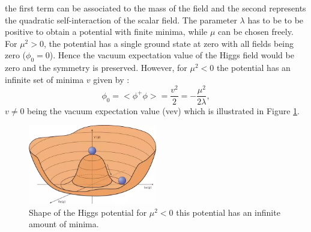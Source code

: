the first term can be associated to the mass of the field and the second represents the quadratic self-interaction of the scalar field. The parameter $\lambda$ has to be to be positive to obtain a potential with finite minima, while $\mu$ can be chosen freely. For $\mu^{2} > 0$, the potential has a single ground state at zero with all fields being zero ($\phi_0 = 0$). Hence the vacuum expectation value of the Higgs field would be zero and the symmetry is preserved. However, for $\mu^{2} < 0$ the potential has an infinite set of minima $v$ given by :
\begin{equation}
    \phi_{0}=<\phi^{+} \phi>=\frac{v^{2}}{2}=-\frac{\mu^{2}}{2 \lambda},
\end{equation}
$v\neq0$ being the vacuum expectation value (vev) which is illustrated in Figure \ref{fig:chap1:Higggs_potential}.
\begin{figure}[htbp]
    \centering
    \includegraphics[width=0.5\textwidth]{Ch1/Img/Higgs_potential.png}
    \caption{Shape of the Higgs potential for $\mu^{2} < 0$ this potential has an infinite amount of minima. \cite{HiggsPotential}}
    \label{fig:chap1:Higggs_potential}
\end{figure}

